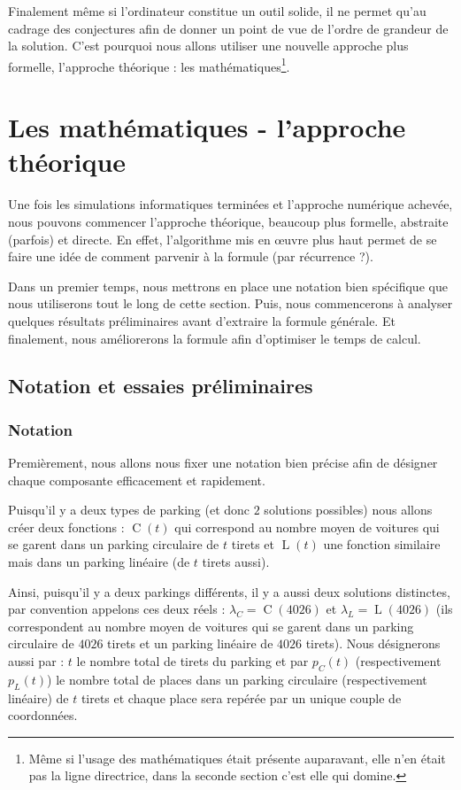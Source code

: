 \documentclass[a4paper,francais,11pt]{article}
\begin{document}
Finalement même si l'ordinateur constitue un outil solide, il ne permet qu'au cadrage des conjectures afin de donner un point de vue de l'ordre de grandeur de la solution. C'est pourquoi nous allons utiliser une nouvelle approche plus formelle, l'approche théorique : les mathématiques\footnote{Même si l'usage des mathématiques était présente auparavant, elle n'en était pas la ligne directrice, dans la seconde section c'est elle qui domine.}.
\section{Les mathématiques - l'approche théorique}
Une fois les simulations informatiques terminées et l'approche numérique achevée, nous pouvons commencer l'approche théorique, beaucoup plus formelle, abstraite (parfois) et directe. En effet, l'algorithme mis en œuvre plus haut permet de se faire une idée de comment parvenir à la formule (par récurrence ?).

Dans un premier temps, nous mettrons en place une notation bien spécifique que nous utiliserons tout le long de cette section. Puis, nous commencerons à analyser quelques résultats préliminaires avant d'extraire la formule générale. Et finalement, nous améliorerons la formule afin d'optimiser le temps de calcul.

\subsection{Notation et essaies préliminaires}
\subsubsection{Notation}
Premièrement, nous allons nous fixer une notation bien précise afin de désigner chaque composante efficacement et rapidement. 

Puisqu'il y a deux types de parking (et donc $2$ solutions possibles) nous allons créer deux fonctions : $\operatorname{C}(t)$ qui correspond au nombre moyen de voitures qui se garent dans un parking circulaire de $t$ tirets et $\operatorname{L}(t)$ une fonction similaire mais dans un parking linéaire (de $t$ tirets aussi).

Ainsi, puisqu'il y a deux parkings différents, il y a aussi deux solutions distinctes, par convention appelons ces deux réels : $\lambda_C=\operatorname{C}(4026)$ et $\lambda_L=\operatorname{L}(4026)$ (ils correspondent au nombre moyen de voitures qui se garent dans un parking circulaire de $4026$ tirets et un parking linéaire de $4026$ tirets). Nous désignerons aussi par : $t$ le nombre total de tirets du parking et par $p_C\left(t\right)$ (respectivement $p_L\left(t\right)$) le nombre total de places dans un parking circulaire (respectivement linéaire) de $t$ tirets et chaque place sera repérée par un unique couple de coordonnées.
\end{document}
